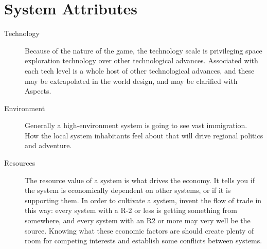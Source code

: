 \section{System Attributes}
\label{sec:System Attributes}

\begin{description}
\item[Technology]
Because of the nature of the game, the technology scale is privileging space exploration technology over other technological advances. Associated with each tech level is a whole host of other technological advances, and these may be extrapolated in the world design, and may be clarified with Aspects.

\item[Environment]
Generally a high-environment system is going to see vast immigration. How the local system inhabitants feel about that will drive regional politics and adventure.

\item[Resources]
The resource value of a system is what drives the economy. It tells you if the system is economically dependent on other systems, or if it is supporting them. In order to cultivate a system, invent the flow of trade in this way: every system with a R-2 or less is getting something from somewhere, and every system with an R2 or more may very well be the source. Knowing what these economic factors are should create plenty of room for competing interests and establish
some conflicts between systems.
\end{description}

